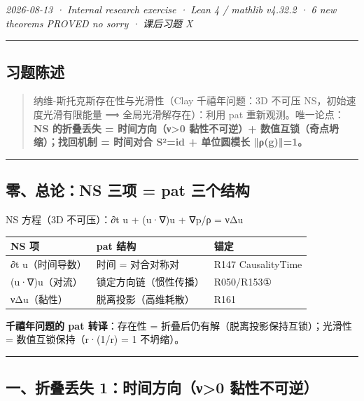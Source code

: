 \documentclass[
]{article}
\newcounter{none} %
\begin{document}
\emph{2026-08-13 · Internal research exercise · Lean 4 / mathlib v4.32.2
· 6 new theorems PROVED no sorry · 课后习题 X }

\begin{center}\rule{0.5\linewidth}{0.5pt}\end{center}

\subsection{习题陈述}\label{ux4e60ux9898ux9648ux8ff0}

\begin{quote}
纳维-斯托克斯存在性与光滑性（Clay 千禧年问题：3D 不可压
NS，初始速度光滑有限能量 ⟹ 全局光滑解存在）：利用 pat
重新观测。唯一论点：\textbf{NS 的折叠丢失 = 时间方向（ν\textgreater0
黏性不可逆）+ 数值互锁（奇点坍缩）；找回机制 = 时间对合 S²=id +
单位圆模长 ‖ρ(g)‖=1。}
\end{quote}

\begin{center}\rule{0.5\linewidth}{0.5pt}\end{center}

\subsection{零、总论：NS 三项 = pat
三个结构}\label{ux96f6ux603bux8bbans-ux4e09ux9879-pat-ux4e09ux4e2aux7ed3ux6784}

NS 方程（3D 不可压）：∂t u + (u·∇)u + ∇p/ρ = νΔu

{\def\LTcaptype{none} %
\begin{longtable}[]{@{}lll@{}}
\toprule\noalign{}
NS 项 & pat 结构 & 锚定 \\
\midrule\noalign{}
\endhead
\bottomrule\noalign{}
\endlastfoot
∂t u（时间导数） & 时间 = 对合对称对 & R147 CausalityTime \\
(u·∇)u（对流） & 锁定方向链（惯性传播） & R050/R153① \\
νΔu（黏性） & 脱离投影（高维耗散） & R161 \\
\end{longtable}
}

\textbf{千禧年问题的 pat 转译}：存在性 =
折叠后仍有解（脱离投影保持互锁）；光滑性 = 数值互锁保持（r·(1/r) = 1
不坍缩）。

\begin{center}\rule{0.5\linewidth}{0.5pt}\end{center}

\subsection{一、折叠丢失 1：时间方向（ν\textgreater0
黏性不可逆）}\label{ux4e00ux6298ux53e0ux4e22ux5931-1ux65f6ux95f4ux65b9ux5411ux3bd0-ux9ecfux6027ux4e0dux53efux9006}
\end{document}
